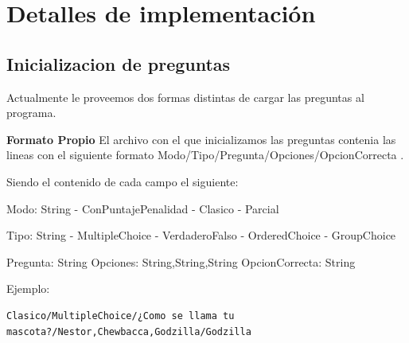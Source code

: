 \documentclass[titlepage,a4paper]{article}
\begin{document}
\section{Detalles de implementación}\label{sec:implementacion}

\subsection{Inicializacion de preguntas}
Actualmente le proveemos dos formas distintas de cargar las preguntas al programa.

\begin{description}
{\bf Formato Propio}\newline
El archivo con el que inicializamos las preguntas contenia las lineas con el siguiente formato Modo/Tipo/Pregunta/Opciones/OpcionCorrecta .\newline
\newline

Siendo el contenido de cada campo el siguiente:\newline
\newline

Modo: String\newline
\indent- ConPuntajePenalidad\newline
\indent- Clasico\newline
\indent- Parcial\newline
\newline

Tipo: String\newline
\indent- MultipleChoice\newline
\indent- VerdaderoFalso\newline
\indent- OrderedChoice\newline
\indent- GroupChoice\newline
\newline

Pregunta: String\newline
\newline
Opciones: String,String,String\newline
\newline
OpcionCorrecta: String\newline
\newline

Ejemplo:\newline
\begin{verbatim}
Clasico/MultipleChoice/¿Como se llama tu mascota?/Nestor,Chewbacca,Godzilla/Godzilla
\end{verbatim}
\newline

\end{description}
\end{document}
